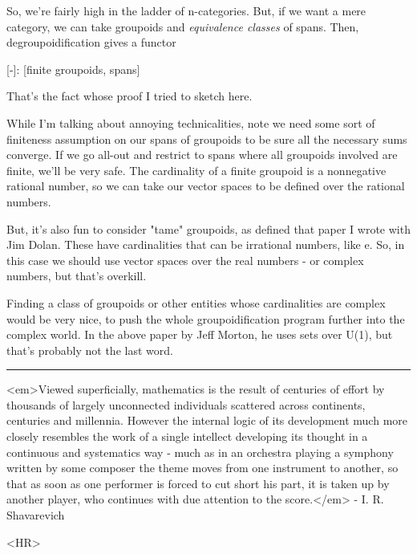 So, we're fairly high in the ladder of n-categories.  But, if we
want a mere category, we can take groupoids and \emph{equivalence classes}
of spans.  Then, degroupoidification gives a functor

[-]: [finite groupoids, spans] 

That's the fact whose proof I tried to sketch here.  

While I'm talking about annoying technicalities, note we need 
some sort of finiteness assumption on our spans of groupoids
to be sure all the necessary sums converge.   If we go all-out
and restrict to spans where all groupoids involved are finite,
we'll be very safe.  The cardinality of a finite groupoid is a
nonnegative rational number, so we can take our vector spaces to 
be defined over the rational numbers.

But, it's also fun to consider "tame" groupoids, as defined that 
paper I wrote with Jim Dolan.  These have cardinalities that can 
be irrational numbers, like e.   So, in this case we should use
vector spaces over the real numbers - or complex numbers, but that's
overkill.

Finding a class of groupoids or other entities whose cardinalities
are complex would be very nice, to push the whole groupoidification
program further into the complex world.  In the above paper by 
Jeff Morton, he uses sets over U(1), but that's probably not the
last word.


\par\noindent\rule{\textwidth}{0.4pt}
<em>Viewed superficially, mathematics is the result of centuries of effort by
thousands of largely unconnected individuals scattered across continents, 
centuries and millennia.  However the internal logic of its development
much more closely resembles the work of a single intellect developing its
thought in a continuous and systematics way - much as in an orchestra playing
a symphony written by some composer the theme moves from one instrument 
to another, so that as soon as one performer is forced to cut short his part,
it is taken up by another player, who continues with due attention to the
score.</em> - I. R. Shavarevich

<HR>




